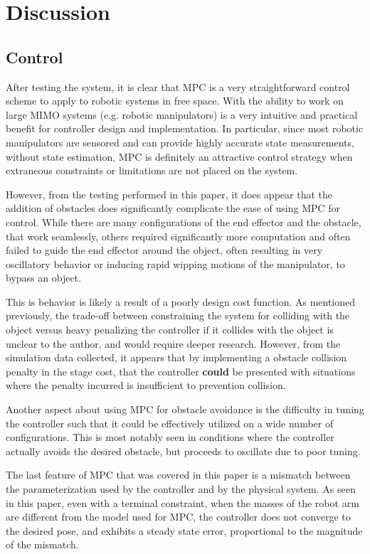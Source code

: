 \documentclass[journal]{IEEEtran}
\begin{document}
\section{Discussion}

\subsection{Control}

After testing the system, it is clear that MPC is a very straightforward control scheme to apply to robotic systems in free space. With the ability to work on large MIMO systems (e.g. robotic manipulators) is a very intuitive and practical benefit for controller design and implementation. In particular, since most robotic manipulators are sensored and can provide highly accurate state measurements, without state estimation, MPC is definitely an attractive control strategy when extraneous constraints or limitations are not placed on the system.

However, from the testing performed in this paper, it does appear that the addition of obstacles does significantly complicate the ease of using MPC for control. While there are many configurations of the end effector and the obstacle, that work seamlessly, others required significantly more computation and often failed to guide the end effector around the object, often resulting in very oscillatory behavior or inducing rapid wipping motions of the manipulator, to bypass an object.

This is behavior is likely a result of a poorly design cost function. As mentioned previously, the trade-off between constraining the system for colliding with the object versus heavy penalizing the controller if it collides with the object is unclear to the author, and would require deeper research. However, from the simulation data collected, it appears that by implementing a obstacle collision penalty in the stage cost, that the controller \textbf{could} be presented with situations where the penalty incurred is insufficient to prevention collision.

Another aspect about using MPC for obstacle avoidance is the difficulty in tuning the controller such that it could be effectively utilized on a wide number of configurations. This is most notably seen in conditions where the controller actually avoids the desired obstacle, but proceeds to oscillate due to poor tuning.

The last feature of MPC that was covered in this paper is a mismatch between the parameterization used by the controller and by the physical system. As seen in this paper, even with a terminal constraint, when the masses of the robot arm are different from the model used for MPC, the controller does not converge to the desired pose, and exhibits a steady state error, proportional to the magnitude of the mismatch.
\end{document}
